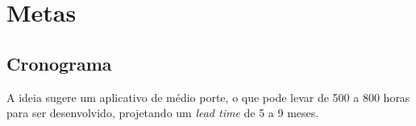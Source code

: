 \chapter[Metas]{Metas}







\section[Cronograma]{Cronograma}


A ideia sugere um aplicativo de médio porte, o que pode levar de 500 a 800 horas para ser desenvolvido, projetando um \textit{lead time} de 5 a 9 meses.



